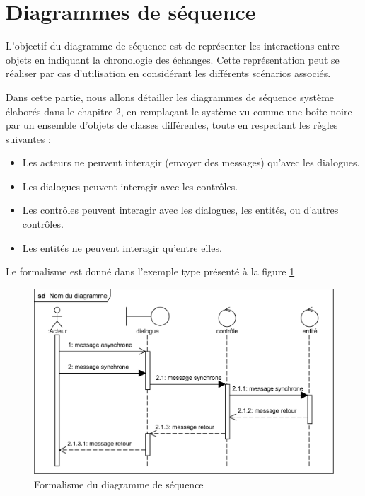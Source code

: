 \section{Diagrammes de séquence}
    L’objectif du diagramme de séquence est de représenter les interactions entre objets en indiquant la chronologie des échanges. Cette représentation peut se réaliser par cas d’utilisation en considérant les différents scénarios associés. \cite{9} 
    
    Dans cette partie, nous allons détailler les diagrammes de séquence système élaborés dans le chapitre 2, en remplaçant le système vu comme une boîte noire par un ensemble d’objets de classes différentes, toute en respectant les règles suivantes :
        \begin{itemize}
            \item[\textbullet] Les acteurs ne peuvent interagir (envoyer des messages) qu’avec les
            dialogues.
            \item[\textbullet] Les dialogues peuvent interagir avec les contrôles. 
            \item[\textbullet] Les contrôles peuvent interagir avec les dialogues, les entités, ou
            d’autres contrôles.
            \item[\textbullet] Les entités ne peuvent interagir qu’entre elles.             
        \end{itemize}
    Le formalisme est donné dans l’exemple type présenté à la figure \ref{fig33}\\
            \begin{figure}[h!]
                 \centering                 \includegraphics[scale=1.23]{images/exemple ds.png}
                 \caption{Formalisme du diagramme de séquence}
                 \label{fig33}
            \end{figure}
    \clearpage
    
